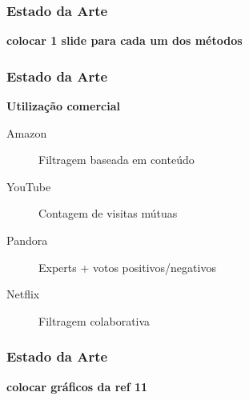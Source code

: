 \begin{frame}
\frametitle{Estado da Arte}
\textbf{colocar 1 slide para cada um dos métodos}
\end{frame}

\begin{frame}
\frametitle{Estado da Arte}

\textbf{Utilização comercial} \cite{chiang2012networked}

\begin{description}
\item[Amazon] Filtragem baseada em conteúdo
\item[YouTube] Contagem de visitas mútuas
\item[Pandora] Experts + votos positivos/negativos
\item[Netflix] Filtragem colaborativa
\end{description}
\end{frame}

\begin{frame}
\frametitle{Estado da Arte}

\textbf{colocar gráficos da ref 11}
\end{frame}


